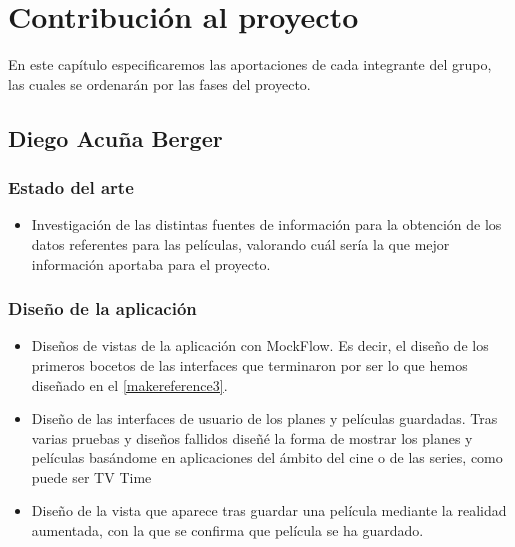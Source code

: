 
\cleardoublepage


\chapter{Contribución al proyecto}
\label{makereference7}
En este capítulo especificaremos las aportaciones de cada integrante del grupo,
 las cuales se ordenarán por las fases del proyecto.

\section{Diego Acuña Berger}
\label{makereference7.1}
    \subsection{Estado del arte}
    \label{makereference7.1.1}
        \begin{itemize}
            \item Investigación de las distintas fuentes de información para la obtención de los datos referentes para las películas, valorando cuál sería la que mejor información aportaba para el proyecto.
        \end{itemize}
    \subsection{Diseño de la aplicación}
    \label{makereference7.1.2}
        \begin{itemize}
            \item Diseños de vistas de la aplicación con MockFlow. Es decir, el diseño de los primeros bocetos de las interfaces que terminaron por ser lo que hemos diseñado en el \autoref{makereference3}.
            \item Diseño de las interfaces de usuario de los planes y películas
            guardadas. Tras varias pruebas y diseños fallidos diseñé la forma de mostrar los planes y películas basándome en aplicaciones del ámbito del cine o de las series, como puede ser TV Time \cite{tvtime}
            \item Diseño de la vista que aparece tras guardar una película mediante la realidad aumentada, con la que se confirma que película se ha guardado.
        \end{itemize}
